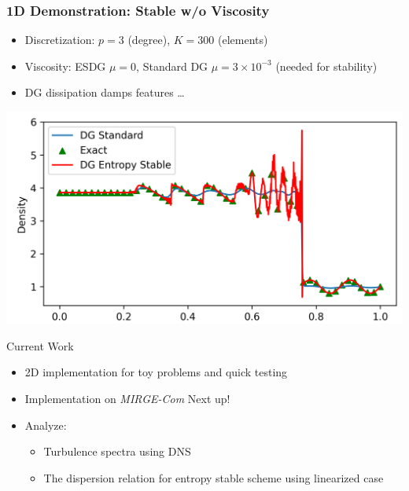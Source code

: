 \begin{frame}\frametitle{1D Demonstration:  Stable w/o Viscosity}
	\begin{itemize}
	
		\item Discretization: $p=3$ (degree), $K = 300$ (elements)
		\item Viscosity: ESDG $\mu = 0$, Standard DG $\mu = 3\times 10^{-3}$ (needed for stability)
                \item DG dissipation damps features \ldots
                \end{itemize}
                \medskip
                \begin{center}
                          \includegraphics[width=0.6\linewidth]{figures/RHO.png}          
	\end{center}
        \centerline{}
\end{frame}

\begin{frame}{Current Work}
	\begin{itemize}
		\setlength{\itemsep}{0.2in}
		\item  2D implementation for toy problems and quick testing
		\item  Implementation on \textit{MIRGE-Com} Next up!
		\item Analyze:
		\begin{itemize}
			\item Turbulence spectra using DNS
			\item The dispersion relation for entropy stable scheme using linearized case
		\end{itemize}
	\end{itemize}
      \end{frame}

